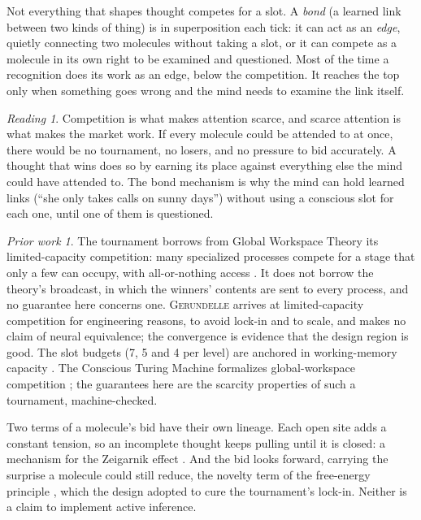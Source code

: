 \documentclass[11pt]{article}
\newcommand{\gerundelle}{\textsc{Gerundelle}}
\theoremstyle{remark}
\newtheorem*{reading}{Reading}
\newtheorem*{prior}{Prior work}
\begin{document}
Not everything that shapes thought competes for a slot. A \emph{bond} (a learned link
between two kinds of thing) is in superposition each tick: it can act as an \emph{edge},
quietly connecting two molecules without taking a slot, or it can compete as a molecule in
its own right to be examined and questioned. Most of the time a recognition does its work
as an edge, below the competition. It reaches the top only when something goes wrong and
the mind needs to examine the link itself.

\begin{reading}
Competition is what makes attention scarce, and scarce attention is what makes the market
work. If every molecule could be attended to at once, there would be no tournament, no
losers, and no pressure to bid accurately. A thought that wins does so by earning its
place against everything else the mind could have attended to. The bond mechanism is why
the mind can hold learned links (``she only takes calls on sunny days'') without using a
conscious slot for each one, until one of them is questioned.
\end{reading}

\begin{prior}
The tournament borrows from Global Workspace Theory \citep{Baars1988} its limited-capacity
competition: many specialized processes compete for a stage that only a few can occupy,
with all-or-nothing access \citep{Dehaene2014}. It does not borrow the theory's broadcast,
in which the winners' contents are sent to every process, and no guarantee here concerns
one. \gerundelle{} arrives at limited-capacity competition for engineering reasons, to avoid
lock-in and to scale, and makes no claim of neural equivalence; the convergence is evidence
that the design region is good. The slot budgets (7, 5 and 4 per level) are anchored in
working-memory capacity \citep{Miller1956,Cowan2001}. The Conscious Turing Machine
formalizes global-workspace competition \citep{BlumBlum2022}; the guarantees here are the
scarcity properties of such a tournament, machine-checked.

Two terms of a molecule's bid have their own lineage. Each open site adds a constant
tension, so an incomplete thought keeps pulling until it is closed: a mechanism for the
Zeigarnik effect \citep{Zeigarnik1927}. And the bid looks forward, carrying the surprise a
molecule could still reduce, the novelty term of the free-energy principle
\citep{Friston2010}, which the design adopted to cure the tournament's lock-in. Neither is a
claim to implement active inference.
\end{prior}
\end{document}
